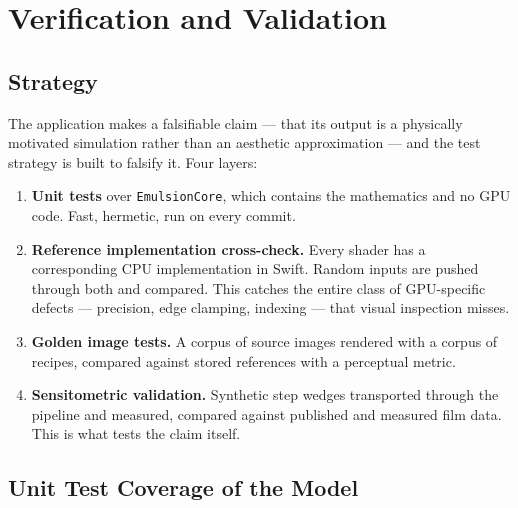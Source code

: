 \section{Verification and Validation}
\label{sec:validation}

\subsection{Strategy}

The application makes a falsifiable claim --- that its output is a physically
motivated simulation rather than an aesthetic approximation --- and the test
strategy is built to falsify it. Four layers:

\begin{enumerate}
\item \textbf{Unit tests} over \texttt{EmulsionCore}, which contains the
mathematics and no GPU code. Fast, hermetic, run on every commit.
\item \textbf{Reference implementation cross-check.} Every shader has a
corresponding CPU implementation in Swift. Random inputs are pushed through both
and compared. This catches the entire class of GPU-specific defects ---
precision, edge clamping, indexing --- that visual inspection misses.
\item \textbf{Golden image tests.} A corpus of source images rendered with a
corpus of recipes, compared against stored references with a perceptual metric.
\item \textbf{Sensitometric validation.} Synthetic step wedges transported
through the pipeline and measured, compared against published and measured film
data. This is what tests the claim itself.
\end{enumerate}

\subsection{Unit Test Coverage of the Model}

